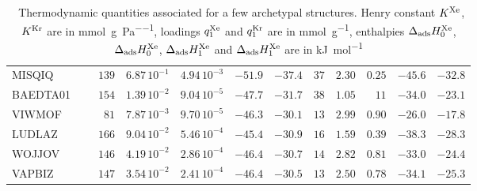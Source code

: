\documentclass[main.tex]{subfiles}
\begin{document}
\begin{table}[hb]
\begin{tabular}{|lr|rrrrr|rrrrr|}
        MISQIQ &~\cite{MISQIQ}        &  $139$  &  $6.87\,10^{-1}$  &  $4.94\,10^{-3}$  &  $-51.9$  &  $-37.4$  &  $ 37$  &  $2.30$  &  $0.25$  &  $-45.6$  &  $-32.8$  \\
      BAEDTA01 &~\cite{BAEDTA01}      &  $154$  &  $1.39\,10^{-2}$  &  $9.04\,10^{-5}$  &  $-47.7$  &  $-31.7$  &  $ 38$  &  $1.05$  &  $  11$  &  $-34.0$  &  $-23.1$  \\
        VIWMOF &~\cite{VIWMOF}        &  $ 81$  &  $7.87\,10^{-3}$  &  $9.70\,10^{-5}$  &  $-46.3$  &  $-30.1$  &  $ 13$  &  $2.99$  &  $0.90$  &  $-26.0$  &  $-17.8$  \\
        LUDLAZ &~\cite{LUDLAZ}        &  $166$  &  $9.04\,10^{-2}$  &  $5.46\,10^{-4}$  &  $-45.4$  &  $-30.9$  &  $ 16$  &  $1.59$  &  $0.39$  &  $-38.3$  &  $-28.3$  \\
        WOJJOV &~\cite{WOJJOV}        &  $146$  &  $4.19\,10^{-2}$  &  $2.86\,10^{-4}$  &  $-46.4$  &  $-30.7$  &  $ 14$  &  $2.82$  &  $0.81$  &  $-33.0$  &  $-24.4$  \\
        VAPBIZ &~\cite{VAPBIZ}        &  $147$  &  $3.54\,10^{-2}$  &  $2.41\,10^{-4}$  &  $-46.4$  &  $-30.5$  &  $ 13$  &  $2.50$  &  $0.78$  &  $-34.1$  &  $-25.3$  \\
    \hline
    \end{tabular}
    \caption{\ Thermodynamic quantities associated for a few archetypal structures. Henry constant $K^{\text{Xe}}$, $K^{\text{Kr}}$ are in \si{\milli\mol\per\gram\per\pascal}, loadings $q^{\text{Xe}}_{\text{1}}$ and $q^{\text{Kr}}_{\text{1}}$ are in \si{\milli\mol\per\gram}, enthalpies $\Delta_{\text{ads}}H^{\text{Xe}}_{\text{0}}$, $\Delta_{\text{ads}}H^{\text{Xe}}_{\text{0}}$, $\Delta_{\text{ads}}H^{\text{Xe}}_{\text{1}}$ and $\Delta_{\text{ads}}H^{\text{Xe}}_{\text{1}}$ are in \si{\kilo\joule\per\mol}}\label{tbl:thermo}
\end{table}
\end{document}
